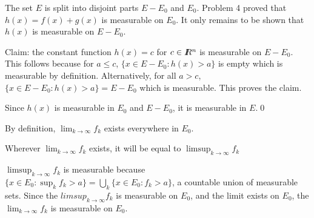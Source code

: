 The set $E$ is split into disjoint parts $E-E_0$ and $E_0$.
Problem 4 proved that $h(x)=f(x)+g(x)$ is measurable on $E_0$.
It only remains to be shown that $h(x)$ is measurable on $E-E_0$.


Claim: the constant function $h(x)=c$ for $c\in I\kern-4pt R^n$ is measurable on $E-E_0$.
This follows because for $a\leq c$, $\{x\in E-E_0:h(x)>a\}$ is empty which is measurable by definition.
Alternatively, for all $a>c$, $\{x\in E-E_0:h(x)>a\} = E-E_0$ which is measurable.
This proves the claim.


Since $h(x)$ is measurable in $E_0$ and $E-E_0$, it is measurable in $E$.\hfill\qed\hskip3pt{}




By definition, $\lim_{k\to\infty}f_k$ exists everywhere in $E_0$.


Wherever $\lim_{k\to\infty}f_k$ exists, it will be equal to $\limsup_{k\to\infty}f_k$


$\limsup_{k\to\infty}f_k$ is measurable because $\{x\in E_0:\sup_kf_k>a\}=\bigcup_k\{x\in E_0:f_k>a\}$, a countable union of measurable sets.
Since the $limsup_{k\to\infty}f_k$ is measurable on $E_0$, and the limit exists on $E_0$, the $\lim_{k\to\infty}f_k$ is measurable on $E_0$.
\bye
